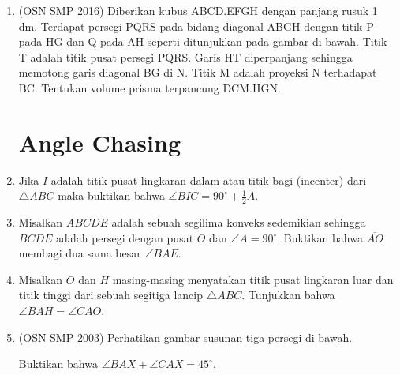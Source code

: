 \documentclass[a4paper, 12pt]{article}
\begin{document}
\begin{enumerate}
    \item (OSN SMP 2016) Diberikan kubus ABCD.EFGH dengan panjang rusuk 1 dm. Terdapat persegi PQRS pada bidang diagonal ABGH dengan titik P pada HG dan Q pada AH seperti ditunjukkan pada gambar di bawah. Titik T adalah titik pusat persegi PQRS. Garis HT diperpanjang sehingga memotong garis diagonal BG di N. Titik M adalah proyeksi N terhadapat BC. Tentukan volume prisma terpancung DCM.HGN.
    
\section{Angle Chasing}
    \item Jika $I$ adalah titik pusat lingkaran dalam atau titik bagi (incenter) dari $\triangle ABC$ maka buktikan bahwa
        $\angle BIC = 90^\circ + \frac{1}{2}A.$

    \item Misalkan $ABCDE$ adalah sebuah segilima konveks sedemikian sehingga $BCDE$ adalah persegi dengan pusat $O$ dan $\angle A = 90^\circ$. Buktikan bahwa $\overline{AO}$ membagi dua sama besar $\angle BAE$.

    \item Misalkan $O$ dan $H$ masing-masing menyatakan titik pusat lingkaran luar dan titik tinggi dari sebuah segitiga lancip $\triangle ABC$. Tunjukkan bahwa $\angle BAH = \angle CAO$.

    \item (OSN SMP 2003) Perhatikan gambar susunan tiga persegi di bawah. 
    
    Buktikan bahwa $\angle BAX+\angle CAX=45^{\circ}$.
    


\end{enumerate}
\end{document}
